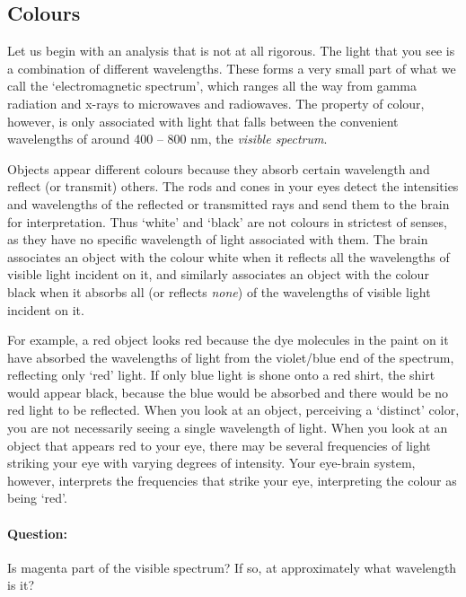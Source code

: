 \subsection{Colours}

Let us begin with an analysis that is not at all rigorous. The light that you see is a combination of different wavelengths. These forms a very small part of what we call the `electromagnetic spectrum', which ranges all the way from gamma radiation and x-rays to microwaves and radiowaves. The property of colour, however, is only associated with light that falls between the convenient wavelengths of around 400 -- 800 nm, the \textit{visible spectrum}.

Objects appear different colours because they absorb certain wavelength and reflect (or transmit) others. The rods and cones in your eyes detect the intensities and wavelengths of the reflected or transmitted rays and send them to the brain for interpretation. Thus `white' and `black' are not colours in strictest of senses, as they have no specific wavelength of light associated with them. The brain associates an object with the colour white when it reflects all the wavelengths of visible light incident on it, and similarly associates an object with the colour black when it absorbs all (or reflects \textit{none}) of the wavelengths of visible light incident on it. 

For example, a red object looks red because the dye molecules in the paint on it have absorbed the wavelengths of light from the violet/blue end of the spectrum, reflecting only `red' light. If only blue light is shone onto a red shirt, the shirt would appear black, because the blue would be absorbed and there would be no red light to be reflected. When you look at an object, perceiving a `distinct' color, you are not necessarily seeing a single wavelength of light. When you look at an object that appears red to your eye, there may be several frequencies of light striking your eye with varying degrees of intensity. Your eye-brain system, however, interprets the frequencies that strike your eye, interpreting the colour as being `red'.

\begin{tcolorbox}
\paragraph{Question: } Is magenta part of the visible spectrum? If so, at approximately what wavelength is it?
\end{tcolorbox}

